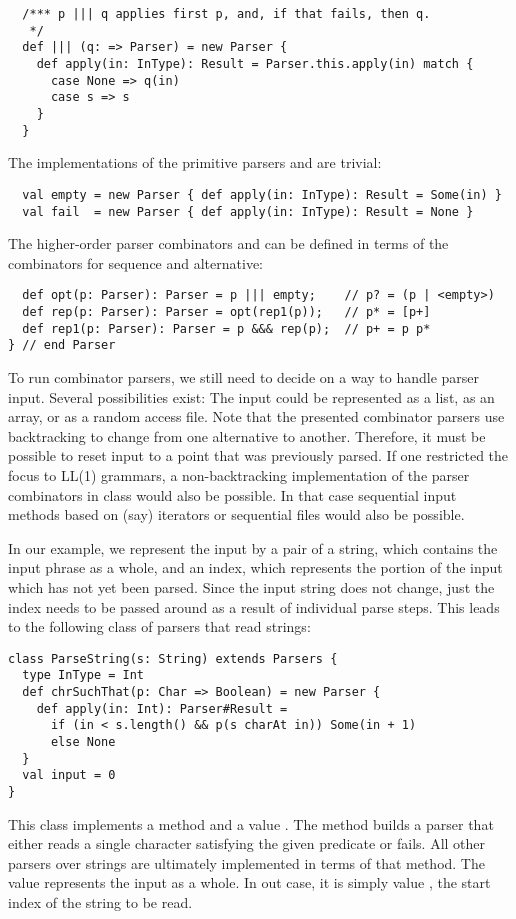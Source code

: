 {\begin{lstlisting}
  /*** p ||| q applies first p, and, if that fails, then q.
   */
  def ||| (q: => Parser) = new Parser {
    def apply(in: InType): Result = Parser.this.apply(in) match {
      case None => q(in)
      case s => s
    }
  }
\end{lstlisting}
The implementations of the primitive parsers  and 
are trivial:
\begin{lstlisting}
  val empty = new Parser { def apply(in: InType): Result = Some(in) }
  val fail  = new Parser { def apply(in: InType): Result = None }
\end{lstlisting}
The higher-order parser combinators  and  can be
defined in terms of the combinators for sequence and alternative:
\begin{lstlisting}
  def opt(p: Parser): Parser = p ||| empty;    // p? = (p | <empty>)
  def rep(p: Parser): Parser = opt(rep1(p));   // p* = [p+]
  def rep1(p: Parser): Parser = p &&& rep(p);  // p+ = p p*
} // end Parser
\end{lstlisting}
To run combinator parsers, we still need to decide on a way to handle
parser input. Several possibilities exist: The input could be
represented as a list, as an array, or as a random access file.  Note
that the presented combinator parsers use backtracking to change from
one alternative to another.  Therefore, it must be possible to reset
input to a point that was previously parsed. If one restricted the
focus to LL(1) grammars, a non-backtracking implementation of the
parser combinators in class  would also be possible. In
that case sequential input methods based on (say) iterators or
sequential files would also be possible.

In our example, we represent the input by a pair of a string, which
contains the input phrase as a whole, and an index, which represents
the portion of the input which has not yet been parsed. Since the
input string does not change, just the index needs to be passed around
as a result of individual parse steps.  This leads to the following
class of parsers that read strings:
\begin{lstlisting}
class ParseString(s: String) extends Parsers {
  type InType = Int
  def chrSuchThat(p: Char => Boolean) = new Parser {
    def apply(in: Int): Parser#Result =
      if (in < s.length() && p(s charAt in)) Some(in + 1)
      else None
  }
  val input = 0
}
\end{lstlisting}
This class implements a method  and a
value . The  method builds a parser that either
reads a single character satisfying the given predicate  or
fails.  All other parsers over strings are ultimately implemented in
terms of that method. The  value represents the input as a
whole. In out case, it is simply value , the start index of
the string to be read.

}
